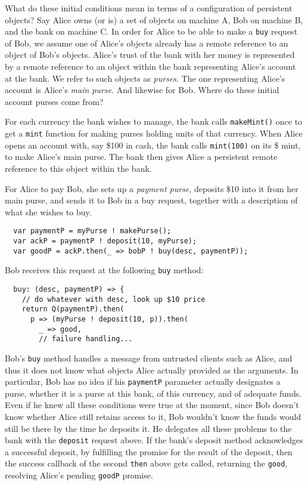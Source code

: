 \documentclass{llncs}
\begin{document}
What do these initial conditions mean in terms of a configuration of persistent objects? Say Alice owns (or is) a set of objects on machine A, Bob on machine B, and the bank on machine C. In order for Alice to be able to make a {\tt buy} request of Bob, we assume one of Alice's objects already has a remote reference to an object of Bob's objects. Alice's trust of the bank with her money is represented by a remote reference to an object within the bank representing Alice's account at the bank. We refer to such objects as \emph{purses}. The one representing Alice's account is Alice's \emph{main purse}. And likewise for Bob. Where do these initial account purses come from?

For each currency the bank wishes to manage, the bank calls {\tt makeMint()} once to get a {\tt mint} function for making purses holding units of that currency. When Alice opens an account with, say \$100 in cash, the bank calls {\tt mint(100)} on its \$ mint, to make Alice's main purse. The bank then gives Alice a persistent remote reference to this object within the bank.

For Alice to pay Bob, she sets up a \emph{payment purse}, deposits \$10 into it from her main purse, and sends it to Bob in a buy request, together with a description of what she wishes to buy.
\begin{verbatim}
  var paymentP = myPurse ! makePurse();
  var ackP = paymentP ! deposit(10, myPurse);
  var goodP = ackP.then(_ => bobP ! buy(desc, paymentP));
\end{verbatim}


Bob receives this request at the following {\tt buy} method:
\begin{verbatim}
  buy: (desc, paymentP) => {
    // do whatever with desc, look up $10 price
    return Q(paymentP).then(
      p => (myPurse ! deposit(10, p)).then(
        _ => good,
        // failure handling...
\end{verbatim}

Bob's {\tt buy} method handles a message from untrusted clients such as Alice, and thus it does not know what objects Alice actually provided as the arguments. In particular, Bob has no idea if his {\tt paymentP} parameter actually designates a purse, whether it is a purse at this bank, of this currency, and of adequate funds. Even if he knew all these conditions were true at the moment, since Bob doesn't know whether Alice still retains access to it, Bob wouldn't know the funds would still be there by the time he deposits it. He delegates all these problems to the bank with the {\tt deposit} request above. If the bank's deposit method acknowledges a successful deposit, by fulfilling the promise for the result of the deposit, then the success callback of the second {\tt then} above gets called, returning the {\tt good}, resolving Alice's pending {\tt goodP} promise.
\end{document}
